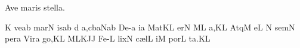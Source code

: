 \beginhymn Ave maris stella.


\Internote
\initiumgregorianum
{}%
\sgn {}{-}{}\punctum K\egn
\sgn ve{}\pes ab\egn
\spatium
\sgn m{a}{r}\punctum N\egn
\sgn {}is\pes ab\egn
\spatium
{}\punctum d\egn
\sgn {}a,\Climacus cbaN\punctum a\augmentum b\egn
\spatium
\divisiominima
\spatium
\sgn D{e}{-}\punctum a\egn
\sgn {}i{}\punctum a\egn
\spatium
\sgn M{a}{t}\pes KL\egn
\sgn {}er\punctum N\egn
\spatium
{}\clivis ML\egn
\sgn {}a,\punctum K\augmentum L\egn
\spatium
\divisiominor
\spatium
\sgn {}A{tq}\punctum M\egn
{}e{}\punctum L\egn
\spatium
\custos N
\lineaproxima
\sgn sem\punctum N\egn
\sgn per\punctum a\egn
\spatium
\sgn V{i}r\punctum a\egn
\sgn go,\punctum K\nonspatium\quilisma L%
\nonspatium\Climacus MLKJ\augmentum J\egn
\spatium
\divisiominima
\spatium
\sgn F{e}{-}\punctum L\egn
\sgn lix\punctum N\egn
\spatium
\sgn c{\ae}l\punctum L\egn
\sgn {}i{}\punctum M\egn
\spatium
\sgn p{o}r\punctum L\egn
\sgn ta.\punctum K\augmentum L\egn
\spatium
\Finisgregoriana

\bigskip

\beginlyrics

